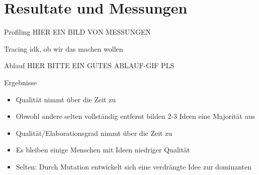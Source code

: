 \section{Resultate und Messungen}
\begin{frame} {Profiling}
	HIER EIN BILD VON MESSUNGEN
\end{frame}

\begin{frame} {Tracing}
	idk, ob wir das machen wollen
\end{frame}

\begin{frame} {Ablauf}
	HIER BITTE EIN GUTES ABLAUF-GIF PLS
\end{frame}

\begin{frame} {Ergebnisse}
	\begin{itemize}
		\item Qualität nimmt über die Zeit zu
		\item Obwohl andere selten vollständig entfernt bilden 2-3 Ideen eine Majorität aus
		\item Qualität/Elaborationsgrad nimmt über die Zeit zu
		\item Es bleiben einige Menschen mit Ideen niedriger Qualität
		\item Selten: Durch Mutation entwickelt sich eine verdrängte Idee zur dominanten
	\end{itemize}
\end{frame}